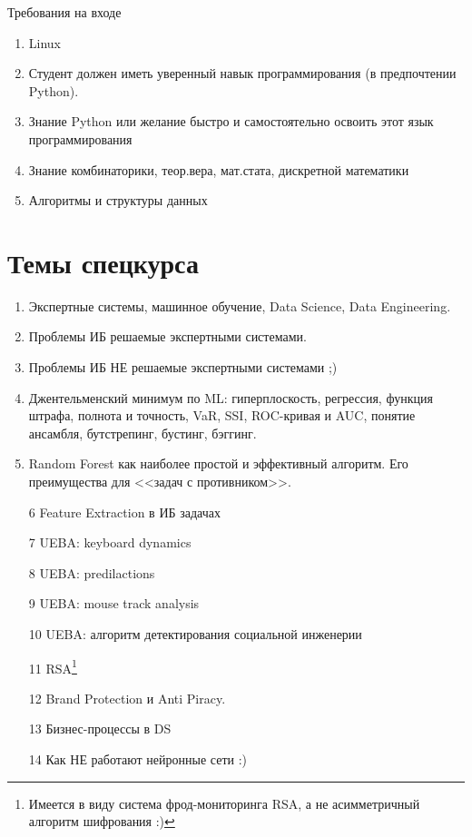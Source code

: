 \documentclass{beamer}
\begin{document}
  \begin{frame}{Требования на входе}
  \begin{enumerate}
  	\item Linux
  	\item Студент должен иметь уверенный навык программирования
  	(в предпочтении Python).
  	\item Знание Python или желание быстро и самостоятельно освоить этот 
  	язык программирования
  	\item Знание комбинаторики, теор.вера, мат.стата, дискретной математики
  	\item Алгоритмы и структуры данных
  \end{enumerate}
  \end{frame}

  \section{Темы спецкурса}\label{section:topics}
  
  \begin{frame}
	\begin{enumerate}
	\item Экспертные системы, машинное обучение, Data Science, Data Engineering.
	\item Проблемы ИБ решаемые экспертными системами.
	\item Проблемы ИБ НЕ решаемые экспертными системами ;)
	\item Джентельменский минимум по ML: гиперплоскость, регрессия, функция штрафа, полнота и точность, VaR, SSI, ROC-кривая и AUC, понятие ансамбля, бутстрепинг, бустинг, бэггинг.
	\item Random Forest как наиболее простой и эффективный алгоритм. Его преимущества для 
	<<задач с противником>>.
	\item[6] Feature Extraction в ИБ задачах
	\end{enumerate}
\end{frame}

  \begin{frame}
\begin{enumerate}
	\item[7] UEBA: keyboard dynamics
	\item[8] UEBA: predilactions
	\item[9] UEBA: mouse track analysis
	\item[10] UEBA: алгоритм детектирования социальной инженерии
	\item[11] RSA\footnote{Имеется в виду система фрод-мониторинга RSA, а не асимметричный алгоритм шифрования :)} 
	\item[12] Brand Protection и Anti Piracy.
	\item[13] Бизнес-процессы в DS
	\item[14] Как НЕ работают нейронные сети :)
\end{enumerate}
\end{frame}
\end{document}
